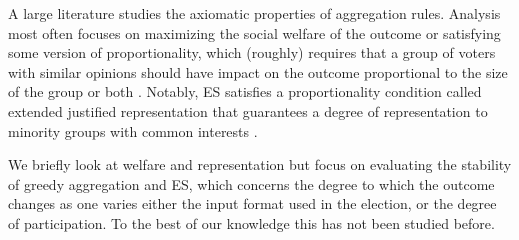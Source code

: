 \documentclass{comsoc2023}
\newcommand{\mes}{ES}
\begin{document}
A large literature studies the axiomatic properties of aggregation rules. Analysis most often focuses on maximizing the social welfare of the outcome \cite{benade2021preference,goel2019knapsack,jain2020participatory,hershkowitz2021district,talmon2019framework} %
or satisfying some version of proportionality, which (roughly) requires that a group of voters  with similar opinions should have impact on the outcome proportional to the size of the group \cite{fain2016core,  aziz2017justified, sanchez2017proportional, fain2018fair, aziz2018proportionally, skowron2020participatory, peters2021proportional} or both \cite{fairstein2022welfare,michorzewski2020price}.  Notably, \mes{} satisfies a proportionality condition called extended justified representation that guarantees a degree of representation to minority groups with common interests \citep{PS20}. 


We briefly look at welfare and representation but focus on evaluating  the stability of greedy aggregation and \mes{}, which  concerns the degree to which the outcome changes as one varies either the input format used in the election, or the degree of participation.  To the best of our knowledge this has not been studied before. 
\end{document}
